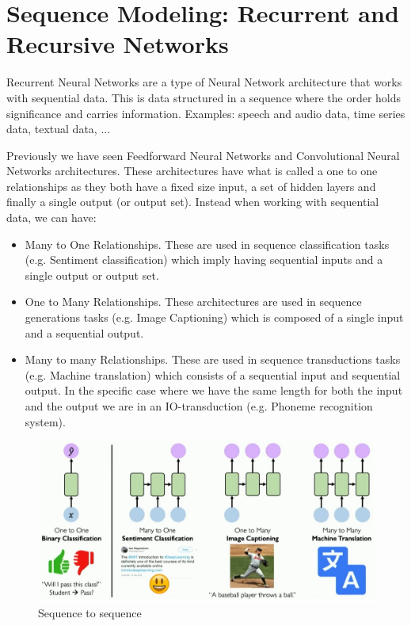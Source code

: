 \chapter{Sequence Modeling: Recurrent and Recursive Networks}

Recurrent Neural Networks are a type of Neural Network architecture that works with sequential data. This is data structured in a sequence where the order holds significance and carries information. Examples: speech and audio data, time series data, textual data, ... 

\noindent Previously we have seen Feedforward Neural Networks and Convolutional Neural Networks architectures. These architectures have what is called a one to one relationships as they both have a fixed size input, a set of hidden layers and finally a single output (or output set). Instead when working with sequential data, we can have:

\begin{itemize}
    \item Many to One Relationships. These are used in sequence classification tasks (e.g. Sentiment classification) which imply having sequential inputs and a single output or output set. 
    \item One to Many Relationships. These architectures are used in sequence generations tasks (e.g. Image Captioning) which is composed of a single input and a sequential output.
    \item Many to many Relationships. These are used in sequence transductions tasks (e.g. Machine translation) which consists of a sequential input and sequential output. In the specific case where we have the same length for both the input and the output we are in an IO-transduction (e.g. Phoneme recognition system).
\end{itemize}

\begin{figure}[h]
    \centering
    \includegraphics[width=15cm]{Images/sequence-to-sequence.jpg}
    \caption{Sequence to sequence }
    \label{fig:sequence-to-sequence}
\end{figure}


